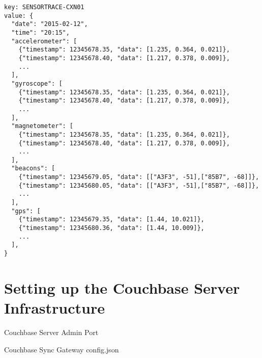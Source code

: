 \begin{lstlisting}[basicstyle=\footnotesize]
key: SENSORTRACE-CXN01
value: {
  "date": "2015-02-12",
  "time": "20:15",
  "accelerometer": [
    {"timestamp": 12345678.35, "data": [1.235, 0.364, 0.021]},
    {"timestamp": 12345678.40, "data": [1.217, 0.378, 0.009]},
    ...
  ],
  "gyroscope": [
    {"timestamp": 12345678.35, "data": [1.235, 0.364, 0.021]},
    {"timestamp": 12345678.40, "data": [1.217, 0.378, 0.009]},
    ...
  ],
  "magnetometer": [
    {"timestamp": 12345678.35, "data": [1.235, 0.364, 0.021]},
    {"timestamp": 12345678.40, "data": [1.217, 0.378, 0.009]},
    ...
  ],
  "beacons": [
    {"timestamp": 12345679.05, "data": [["A3F3", -51],["85B7", -68]]},
    {"timestamp": 12345680.05, "data": [["A3F3", -51],["85B7", -68]]},
    ...
  ],
  "gps": [
    {"timestamp": 12345679.35, "data": [1.44, 10.021]},
    {"timestamp": 12345680.36, "data": [1.44, 10.009]},
    ...
  ],
}
\end{lstlisting}


\section{Setting up the Couchbase Server Infrastructure}

Couchbase Server
Admin Port

Couchbase Sync Gateway
config.json

